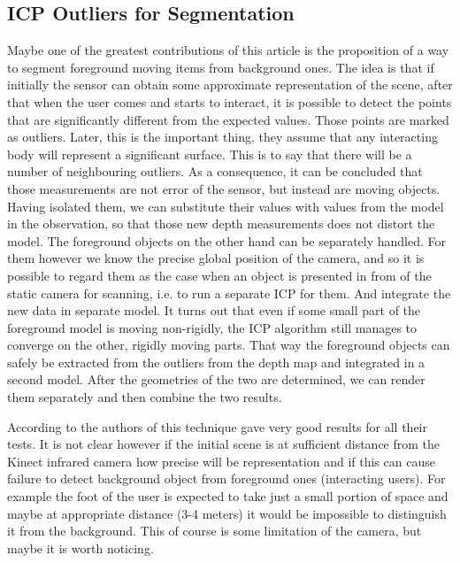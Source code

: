 \documentclass[12pt, a4paper]{article}
\theoremstyle{plain}
\begin{document}
  \subsection{ICP Outliers for Segmentation} %
  \label{sub:ICP Outliers for Segmentation}
    Maybe one of the greatest contributions of this article is the proposition
    of a way to segment foreground moving items from background ones. The idea
    is that if initially the sensor can obtain some approximate representation
    of the scene, after that when the user comes and starts to interact, it is
    possible to detect the points that are significantly different from the
    expected values. Those points are marked as outliers. Later, this is
    the important thing, they assume that any interacting body will represent a
    significant surface. This is to say that there will be a number of
    neighbouring outliers. As a consequence, it can be concluded that those
    measurements are not error of the sensor, but instead are moving objects.
    Having isolated them, we can substitute their values with values from
    the model in the observation, so that those new depth measurements does not distort the model.
    The foreground objects on the other hand can be separately handled. For them
    however we know the precise global position of the camera, and so it is
    possible to regard them as the case when an object is presented in from of
    the static camera for scanning, i.e. to run a separate ICP for them. And
    integrate the new data in separate model. It turns out that even if some
    small part of the foreground model is moving non-rigidly, the ICP algorithm
    still manages to converge on the other, rigidly moving parts. That way the
    foreground objects can safely be extracted from the outliers from the depth
    map and integrated in a second model. After the geometries of the two are
    determined, we can render them separately and then combine the two results.

    According to the authors of \cite{kinectfusion} this technique gave very
    good results for all their tests. It is not clear however if the initial
    scene is at sufficient distance from the Kinect infrared camera how precise
    will be representation and if this can cause failure to detect background
    object from foreground ones (interacting users). For example the foot of the
    user is expected to take just a small portion of space and maybe at
    appropriate distance (3-4 meters) it would be impossible to distinguish it
    from the background. This of course is some limitation of the camera, but
    maybe it is worth noticing.
\end{document}
